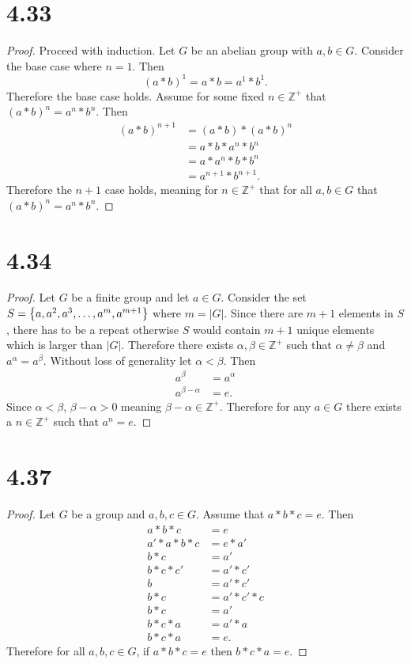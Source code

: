 \documentclass[12pt]{extarticle}
\begin{document}
\section*{4.33}
\begin{proof}
	Proceed with induction. Let $G$ be an abelian group with $a, b \in G$. Consider the base case where $n=1$. Then
	\[
		(a * b)^1 = a * b = a^1 * b^1
	.\]
	Therefore the base case holds. Assume for some fixed $n \in \mathbb{Z}^+$ that $(a*b)^n = a^n * b^n$. Then
	\begin{align*}
		(a*b)^{n+1} &= (a*b) * (a*b)^n \\
		&= a*b * a^n * b^n \\
		&= a * a^n * b * b^n \\
		&= a^{n+1} * b^{n+1}
	.\end{align*}
	Therefore the $n+1$ case holds, meaning for $n \in \mathbb{Z}^+$ that for all $a,b \in G$ that $(a*b)^n = a^n * b^n$.
\end{proof}

\section*{4.34}
\begin{proof}
	Let $G$ be a finite group and let $a \in G$. Consider the set $S = \qty{a, a^2, a^3, \ldots, a^m, a^{m+1}}$ where $m = |G|$. Since there are $m+1$ elements in $S$, there has to be a repeat otherwise $S$ would contain $m+1$ unique elements which is larger than $|G|$. Therefore there exists $\alpha, \beta \in \mathbb{Z}^+$ such that $\alpha \neq \beta$ and $a^\alpha = a^\beta$. Without loss of generality let $\alpha < \beta$. Then
	\begin{align*}
		a^\beta &= a^\alpha \\
		a^{\beta - \alpha} &= e
	.\end{align*}
	Since $\alpha < \beta$, $\beta - \alpha > 0$ meaning $\beta - \alpha \in \mathbb{Z}^+$. Therefore for any $a \in G$ there exists a $n \in \mathbb{Z}^+$ such that $a^n = e$.
\end{proof}

\section*{4.37}
\begin{proof}
	Let $G$ be a group and $a,b,c \in G$. Assume that $a * b * c = e$. Then
	\begin{align*}
		a * b * c &= e \\
		a' * a * b * c &= e * a' \\
		b * c &= a' \\
		b * c * c' &= a' * c' \\
		b &= a' * c' \\
		b * c &= a' * c' * c \\
		b * c &= a' \\
		b * c * a &= a' * a \\
		b * c * a &= e
	.\end{align*}
	Therefore for all $a,b,c \in G$, if $a * b * c = e$ then $b * c * a = e$.
\end{proof}
\end{document}
